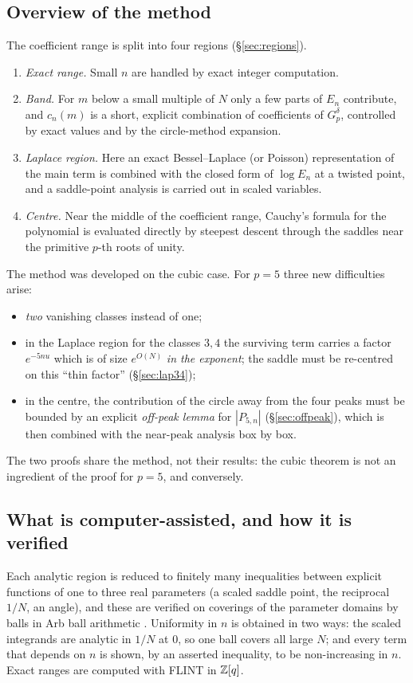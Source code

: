 \subsection{Overview of the method}
The coefficient range is split into four regions (\S\ref{sec:regions}).
\begin{enumerate}
\item \emph{Exact range.} Small $n$ are handled by exact integer computation.
\item \emph{Band.} For $m$ below a small multiple of $N$ only a few parts of $E_n$ contribute, and $c_n(m)$ is a short,
explicit combination of coefficients of $G_p^\delta$, controlled by exact values and by the circle-method expansion.
\item \emph{Laplace region.} Here an exact Bessel--Laplace (or Poisson) representation of the main term is combined with
the closed form of $\log E_n$ at a twisted point, and a saddle-point analysis is carried out in scaled variables.
\item \emph{Centre.} Near the middle of the coefficient range, Cauchy's formula for the polynomial is evaluated directly
by steepest descent through the saddles near the primitive $p$-th roots of unity.
\end{enumerate}
The method was developed on the cubic case. For $p=5$ three new difficulties arise:
\begin{itemize}
\item \emph{two} vanishing classes instead of one;
\item in the Laplace region for the classes $3,4$ the surviving term carries a factor $e^{-5nu}$ which is of size
$e^{O(N)}$ \emph{in the exponent}; the saddle must be re-centred on this ``thin factor'' (\S\ref{sec:lap34});
\item in the centre, the contribution of the circle away from the four peaks must be bounded by an explicit
\emph{off-peak lemma} for $|P_{5,n}|$ (\S\ref{sec:offpeak}), which is then combined with the near-peak analysis box by box.
\end{itemize}
The two proofs share the method, not their results: the cubic theorem is not an ingredient of the proof for $p=5$, and
conversely.

\subsection{What is computer-assisted, and how it is verified}
Each analytic region is reduced to finitely many inequalities between explicit functions of one to three real parameters
(a scaled saddle point, the reciprocal $1/N$, an angle), and these are verified on coverings of the parameter domains by
balls in Arb ball arithmetic \cite{Arb}. Uniformity in $n$ is obtained in two ways: the scaled integrands are analytic in
$1/N$ at $0$, so one ball covers all large $N$; and every term that depends on $n$ is shown, by an asserted inequality, to
be non-increasing in $n$. Exact ranges are computed with FLINT \cite{FLINT} in $\mathbb Z[q]$.

